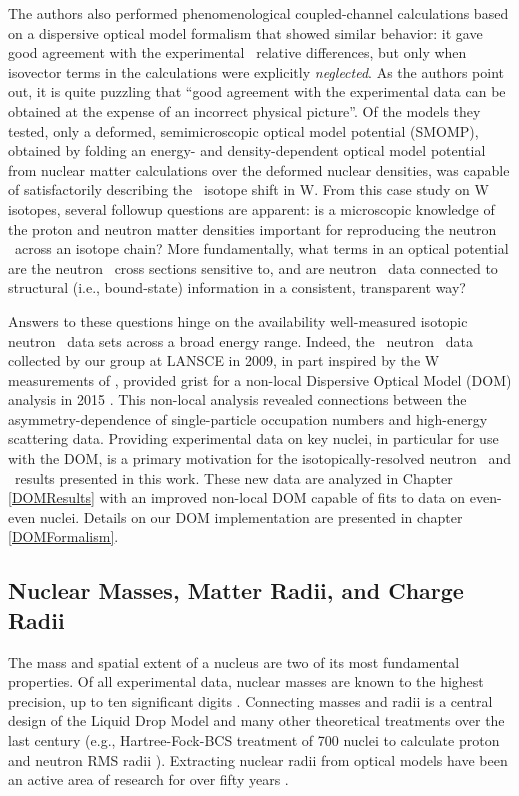 The authors also performed phenomenological coupled-channel calculations
based on a dispersive optical model formalism
\cite{Mahaux1991} that showed similar behavior: it gave good agreement with the
experimental \tot\ relative differences, but only when isovector terms in the calculations
were explicitly \textit{neglected}. As the
authors point out, it is quite puzzling that ``good agreement with the
experimental data can be obtained at the expense of an incorrect physical
picture''.
Of the models they tested, only a deformed, semimicroscopic
optical model potential (SMOMP),
obtained by folding an energy- and density-dependent optical model potential from nuclear matter 
calculations over the deformed nuclear densities, was capable of satisfactorily describing the
\tot\ isotope shift in W. From this case study on W isotopes, several followup questions
are apparent: is a microscopic knowledge of the proton and neutron matter
densities important for reproducing the neutron \tot\ across an isotope
chain? More fundamentally, what terms in an optical potential are the neutron
\tot\ cross sections sensitive to, and are neutron \tot\ data connected to
structural (i.e., bound-state) information in a consistent, transparent way?

Answers to these questions hinge on the availability well-measured 
isotopic neutron \tot\ data sets across a broad energy range. Indeed, the
\caAughtEight\ neutron \tot\ data collected by our group at LANSCE in 2009, in
part inspired by the W measurements of \cite{Dietrich2003},
provided grist for a non-local Dispersive Optical Model (DOM) analysis in 2015
\cite{MahzoonPhDThesis}. This non-local analysis revealed connections
between the asymmetry-dependence of single-particle occupation numbers
and high-energy scattering data.
Providing experimental data on key nuclei, in particular for use with the \gls{DOM},
is a primary motivation for the isotopically-resolved neutron \tot\ and \el\
results presented in this work. These new data are analyzed in Chapter \ref{DOMResults} 
with an improved non-local DOM capable of fits to data on even-even nuclei. Details on our DOM
implementation are presented in chapter \ref{DOMFormalism}. 

\subsection{Nuclear Masses, Matter Radii, and Charge Radii}
The mass and spatial extent of a nucleus are two of its most fundamental
properties. Of all experimental data, nuclear masses are known to the highest
precision, up to ten significant digits \cite{AME2016}. Connecting masses and
radii is a central design of the Liquid Drop Model and many other theoretical
treatments over the last century (e.g., Hartree-Fock-BCS treatment of 700 nuclei to calculate 
proton and neutron RMS radii \cite{Angeli1980}). Extracting nuclear radii from optical
models have been an active area of research for over fifty years \cite{Jackson1974}.


